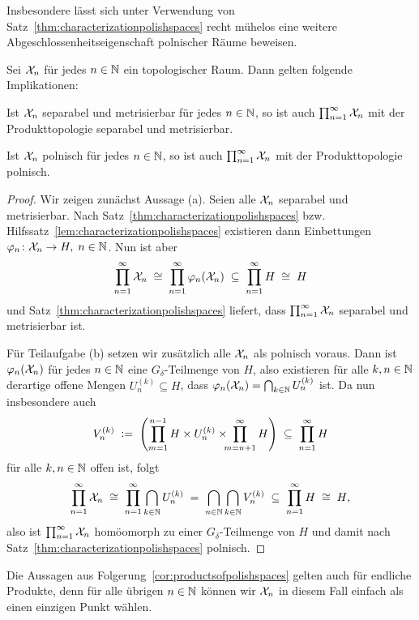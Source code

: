 \documentclass[../main/main.tex]{subfiles}
\begin{document}
	Insbesondere lässt sich unter Verwendung von Satz~\ref{thm:characterizationpolishspaces} recht mühelos eine weitere Abgeschlossenheitseigenschaft polnischer Räume beweisen.
	
	\begin{Folgerung}
		\label{cor:productsofpolishspaces}
		Sei $\mathcal{X}_n$ für jedes $n \in \mathbb{N}$ ein topologischer Raum. Dann gelten folgende Implikationen:
		\begin{enumeratethm}
			\item Ist $\mathcal{X}_n$ separabel und metrisierbar für jedes $n \in \mathbb{N}$, so ist auch $\prod_{n=1}^{\infty} \mathcal{X}_n$ mit der Produkttopologie separabel und metrisierbar.
			\item Ist $\mathcal{X}_n$ polnisch für jedes $n \in \mathbb{N}$, so ist auch $\prod_{n=1}^{\infty} \mathcal{X}_n$ mit der Produkttopologie polnisch.
		\end{enumeratethm}
	\end{Folgerung}
	
	\begin{proof}
		Wir zeigen zunächst Aussage (a). Seien alle $\mathcal{X}_n$ separabel und metrisierbar. Nach Satz~\ref{thm:characterizationpolishspaces} bzw. 
		Hilfssatz~\ref{lem:characterizationpolishspaces} existieren dann Einbettungen $\varphi_n \colon \mathcal{X}_n \to H, \; n \in \mathbb{N}$. Nun ist aber 
		\[ \prod_{n=1}^{\infty} \mathcal{X}_n \; \cong \; \prod_{n=1}^{\infty} \varphi_n(\mathcal{X}_n) \; \subseteq \; \prod_{n=1}^{\infty} H \; \cong \; H \]
		und Satz~\ref{thm:characterizationpolishspaces} liefert, dass $\prod_{n=1}^{\infty} \mathcal{X}_n$ separabel und metrisierbar ist.
		
		Für Teilaufgabe (b) setzen wir zusätzlich alle $\mathcal{X}_n$ als polnisch voraus. Dann ist $\varphi_n(\mathcal{X}_n)$ für jedes $n \in \mathbb{N}$ eine $G_{\delta}$-Teilmenge von $H$, also
		existieren für alle $k, n \in \mathbb{N}$ derartige offene Mengen $U_n^{(k)} \subseteq H$, dass $\varphi_n(\mathcal{X}_n) = \bigcap_{k \in \mathbb{N}} U_n^{(k)}$ ist. Da nun insbesondere auch
		\[ V_n^{(k)} \; \vcentcolon = \; \left( \prod_{m=1}^{n-1} H \times U_n^{(k)} \times \!\!\! \prod_{m=n+1}^{\infty} H \right) \; \subseteq \; \prod_{n=1}^{\infty} H \]
		für alle $k, n \in \mathbb{N}$ offen ist, folgt
		\[ \prod_{n=1}^{\infty} \mathcal{X}_n \; \cong \; \prod_{n=1}^{\infty} \bigcap_{k \in \mathbb{N}} U_n^{(k)} \; = \; \bigcap_{n \in \mathbb{N}} \bigcap_{k \in \mathbb{N}} V_n^{(k)} \; \subseteq \; \prod_{n=1}^{\infty} H \; \cong \; H \text{,} \]
		also ist $\prod_{n=1}^{\infty} \mathcal{X}_n$ homöomorph zu einer $G_{\delta}$-Teilmenge von $H$ und damit nach Satz~\ref{thm:characterizationpolishspaces} polnisch.
	\end{proof}
	
	\begin{Bemerkung}
		Die Aussagen aus Folgerung~\ref{cor:productsofpolishspaces} gelten auch für endliche Produkte, denn für alle übrigen $n \in \mathbb{N}$ können wir $\mathcal{X}_n$ in diesem Fall einfach als einen einzigen Punkt wählen.
	\end{Bemerkung}
	
\end{document}
